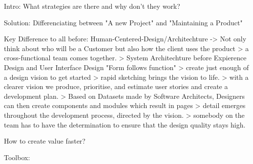 Intro:
What strategies are there and why don't they work?


Solution:
Differenciating between "A new Project" and "Maintaining a Product"

Key Difference to all before: Human-Centered-Design/Architechture -> Not only think about who will be a Customer but also how the client uses the product 
> a cross-functional team comes together.
> System Architechture before Expierence Design and User Interface Design "Form follows function"
> create just enough of a design vision to get started
> rapid sketching brings the vision to life.
> with a clearer vision we produce, prioritise, and estimate user stories and create a development plan.
> Based on Datasets made by Software Architects, Designers can then create components and modules which result in pages
> detail emerges throughout the development process, directed by the vision.
> somebody on the team has to have the determination to ensure that the design quality stays high.

How to create value faster?

Toolbox: